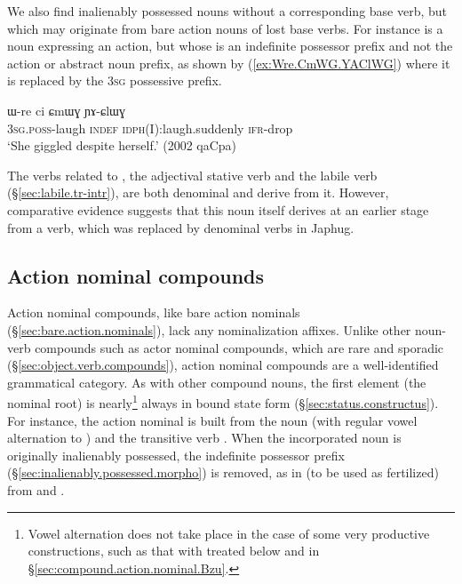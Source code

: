 We also find inalienably possessed nouns without a corresponding base verb, but which may originate from bare action nouns of lost base verbs. For instance  is a noun expressing an action, but whose  is an indefinite possessor prefix and not the action or abstract noun prefix, as shown by (\ref{ex:Wre.CmWG.YAClWG}) where it is replaced by the \textsc{3sg} possessive  prefix. 

\begin{exe}
\ex \label{ex:Wre.CmWG.YAClWG}
\gll  ɯ-re ci ɕmɯɣ ɲɤ-ɕlɯɣ \\
 \textsc{3sg}.\textsc{poss}-laugh \textsc{indef} \textsc{idph}(I):laugh.suddenly \textsc{ifr}-drop \\
\glt  `She giggled despite herself.' (2002 qaCpa)
\end{exe}

The verbs related to  , the adjectival stative verb  and the labile verb  (§\ref{sec:labile.tr-intr}), are both denominal and derive from it. However, comparative evidence suggests that this noun itself derives at an earlier stage from a verb, which was replaced by denominal verbs in Japhug.


\subsection{Action nominal compounds} \label{sec:action.nominal.compounds}
Action nominal compounds, like bare action nominals (§\ref{sec:bare.action.nominals}), lack any nominalization affixes. Unlike other noun-verb compounds such as actor nominal compounds, which are rare and sporadic (§\ref{sec:object.verb.compounds}), action nominal compounds are a well-identified grammatical category. As with other compound nouns, the first element (the nominal root) is nearly\footnote{Vowel alternation does not take place in the case of some very productive constructions, such as that with  treated below and in §\ref{sec:compound.action.nominal.Bzu}.} always in bound state form (§\ref{sec:status.constructus}). For instance, the action nominal  is built from the noun  (with regular vowel alternation to ) and the transitive verb .  When the incorporated noun is originally inalienably possessed, the indefinite possessor prefix (§\ref{sec:inalienably.possessed.morpho}) is removed, as in  (to be used as fertilized) from  and .
 
